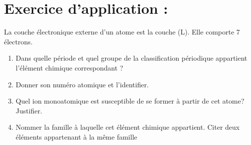 \documentclass[12pt]{article}
\begin{document}
\section{Exercice d’application :}

La couche électronique externe d'un atome est la couche (L). Elle comporte 7 électrons.
\begin{enumerate}
    \item Dans quelle période et quel groupe de la classification périodique appartient l'élément chimique correspondant ?
    \item Donner son numéro atomique et l'identifier.
    \item Quel ion monoatomique est susceptible de se former à partir de cet atome? Justifier.
    \item Nommer la famille à laquelle cet élément chimique appartient. Citer deux éléments
appartenant à la même famille

\end{enumerate}
\end{document}
